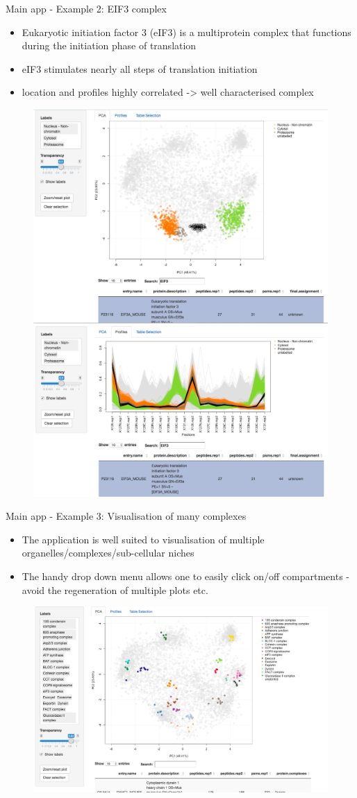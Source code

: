 \documentclass[bigger]{beamer}
\begin{document}
\begin{frame}{Main app - Example 2: EIF3 complex}
\smallskip
\footnotesize {
  \begin{itemize}
  \item Eukaryotic initiation factor 3 (eIF3) is a multiprotein complex that functions during the initiation phase of translation
  \item eIF3 stimulates nearly all steps of translation initiation
  \item location and profiles highly correlated -> well characterised complex
  \end{itemize}
  }
  \begin{figure}
    \includegraphics[width=.5\linewidth]{Figures/demo2-eif3-pca.png}
    \includegraphics[width=.5\linewidth]{Figures/demo2-eif3-profiles.png}
  \end{figure}
\end{frame}



\begin{frame}{Main app - Example 3: Visualisation of many complexes}
\smallskip
\footnotesize {
  \begin{itemize}
  \item The application is well suited to visualisation of multiple organelles/complexes/sub-cellular niches
  \item The handy drop down menu allows one to easily click on/off compartments - avoid
  the regeneration of multiple plots etc.
  \end{itemize}
  }
  \begin{figure}
    \includegraphics[width=.7\linewidth]{Figures/demo3-protein-complexes.png}
  \end{figure}
\end{frame}
\end{document}
